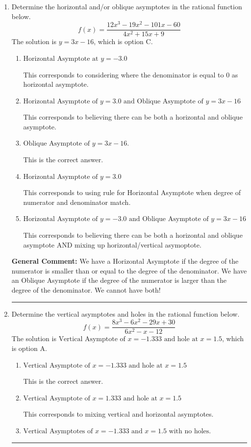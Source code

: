 \documentclass{extbook}[14pt]
\newcommand{\litem}[1]{\item #1

\rule{\textwidth}{0.4pt}}
\begin{document}
\begin{enumerate}\litem{
Determine the horizontal and/or oblique asymptotes in the rational function below.
\[ f(x) = \frac{12x^{3} -19 x^{2} -101 x -60}{4x^{2} +15 x + 9} \]The solution is \( y = 3x -16 \), which is option C.\begin{enumerate}[label=\Alph*.]
\item \( \text{Horizontal Asymptote at } y = -3.0 \)

This corresponds to considering where the denominator is equal to 0 as horizontal asymptote.
\item \( \text{Horizontal Asymptote of } y = 3.0 \text{ and Oblique Asymptote of } y = 3x -16 \)

This corresponds to believing there can be both a horizontal and oblique asymptote.
\item \( \text{Oblique Asymptote of } y = 3x -16. \)

This is the correct answer.
\item \( \text{Horizontal Asymptote of } y = 3.0  \)

This corresponds to using rule for Horizontal Asymptote when degree of numerator and denominator match.
\item \( \text{Horizontal Asymptote of } y = -3.0 \text{ and Oblique Asymptote of } y = 3x -16 \)

This corresponds to believing there can be both a horizontal and oblique asymptote AND mixing up horizontal/vertical asymoptote.
\end{enumerate}

\textbf{General Comment:} We have a Horizontal Asymptote if the degree of the numerator is smaller than or equal to the degree of the denominator. We have an Oblique Asymptote if the degree of the numerator is larger than the degree of the denominator. We cannot have both!
}
\litem{
Determine the vertical asymptotes and holes in the rational function below.
\[ f(x) = \frac{8x^{3} -6 x^{2} -29 x + 30}{6x^{2} -x -12} \]The solution is \( \text{Vertical Asymptote of } x = -1.333 \text{ and hole at } x = 1.5 \), which is option A.\begin{enumerate}[label=\Alph*.]
\item \( \text{Vertical Asymptote of } x = -1.333 \text{ and hole at } x = 1.5 \)

This is the correct answer.
\item \( \text{Vertical Asymptote of } x = 1.333 \text{ and hole at } x = 1.5 \)

This corresponds to mixing vertical and horizontal asymptotes.
\item \( \text{Vertical Asymptotes of } x = -1.333 \text{ and } x = 1.5 \text{ with no holes.} \)


\end{enumerate}}
\end{enumerate}
\end{document}
